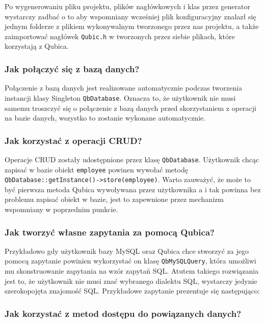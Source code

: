 \documentclass[12pt]{report}
\begin{document}
Po wygenerowaniu pliku projektu, plików nagłówkowych i klas przez generator wystarczy zadbać o to aby wspomniany wcześniej plik konfiguracyjny 
znalazł się jednym folderze z plikiem wykonywalnym tworzonego przez nas projektu, a także zaimportować nagłówek {\tt Qubic.h} w tworzonych przez siebie plikach, które korzystają
z Qubica.

\subsubsection{Jak połączyć się z bazą danych?}

Połączenie z bazą danych jest realizowane automatycznie podczas tworzenia instancji klasy Singleton {\tt QbDatabase}. Oznacza to, że użytkownik nie musi samemu troszczyć
się o połączenie z bazą danych przed skorzystaniem z operacji na bazie danych, wszystko to zostanie wykonane automatycznie.

\subsubsection{Jak korzystać z operacji CRUD?}

Operacje CRUD zostały udostępnione przez klasę {\tt QbDatabase}. Użytkownik chcąc zapisać w bazie obiekt {\tt employee} powinen wywołać metodę 
{\tt QbDatabase::get\-Instance()->store(employee)}. Warto zauważyć, że może to być pierwsza metoda Qubica wywoływana przez użytkownika a i tak powinna bez problemu
zapisać obiekt w bazie, jest to zapewnione przez mechanizm wspomniany w poprzednim punkcie.

\subsubsection{Jak tworzyć własne zapytania za pomocą Qubica?}

Przykładowo gdy użytkownik bazy MySQL oraz Qubica chce stworzyć za jego pomocą zapytanie powinien wykorzystać on klasę {\tt QbMySQLQuery}, która umożliwi mu
skonstruowanie zapytania na wzór zapytań SQL. Atutem takiego rozwiązania jest to, że użytkownik nie musi znać wybranego dialektu SQL, wystarczy jedynie szerokopojęta
znajomość SQL. Przykładowe zapytanie prezentuje się następująco:



\subsubsection{Jak korzystać z metod dostępu do powiązanych danych?}
\end{document}
